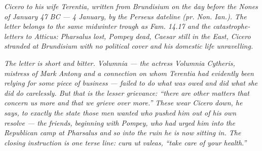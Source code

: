 
\textit{Cicero to his wife Terentia, written from
Brundisium on the day before the Nones of January
47 BC --- 4 January, by the Perseus dateline
(\textit{pr. Non. Ian.}). The letter belongs to the
same midwinter trough as \textit{Fam.} 14.17 and the
catastrophe-letters to Atticus: Pharsalus lost,
Pompey dead, Caesar still in the East, Cicero
stranded at Brundisium with no political cover and
his domestic life unravelling.}

\textit{The letter is short and bitter. Volumnia ---
the actress Volumnia Cytheris, mistress of Mark Antony
and a connection on whom Terentia had evidently been
relying for some piece of business --- failed to do
what was owed and did what she did do carelessly. But
that is the lesser grievance: ``there are other
matters that concern us more and that we grieve over
more.'' These wear Cicero down, he says, to exactly
the state those men wanted who pushed him out of his
own resolve --- the friends, beginning with Pompey,
who had urged him into the Republican camp at
Pharsalus and so into the ruin he is now sitting in.
The closing instruction is one terse line:
\textit{cura ut valeas}, ``take care of your health.''}
